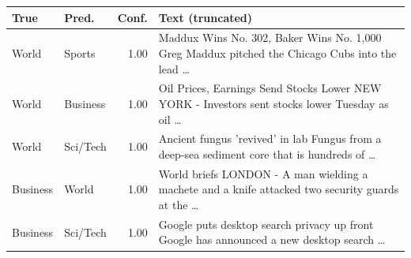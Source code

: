 \begin{tabular}{@{}llr>{\raggedright\arraybackslash}p{4.7cm}@{}}
\toprule
True & Pred. & Conf. & Text (truncated) \\
\midrule
World & Sports & 1.00 & Maddux Wins No. 302, Baker Wins No. 1,000 Greg Maddux pitched the Chicago Cubs into the lead … \\
World & Business & 1.00 & Oil Prices, Earnings Send Stocks Lower NEW YORK - Investors sent stocks lower Tuesday as oil … \\
World & Sci/Tech & 1.00 & Ancient fungus 'revived' in lab Fungus from a deep-sea sediment core that is hundreds of … \\
Business & World & 1.00 & World briefs LONDON - A man wielding a machete and a knife attacked two security guards at the … \\
Business & Sci/Tech & 1.00 & Google puts desktop search privacy up front Google has announced a new desktop search … \\
\bottomrule
\end{tabular}